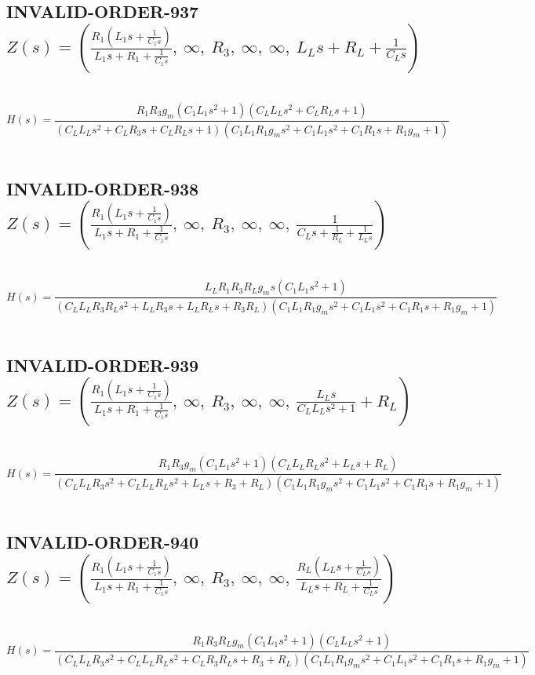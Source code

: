 \documentclass{article}
\begin{document}
\subsection{INVALID-ORDER-937 $Z(s) = \left( \frac{R_{1} \left(L_{1} s + \frac{1}{C_{1} s}\right)}{L_{1} s + R_{1} + \frac{1}{C_{1} s}}, \  \infty, \  R_{3}, \  \infty, \  \infty, \  L_{L} s + R_{L} + \frac{1}{C_{L} s}\right)$ } \ 
\textbf{\[H(s) = \frac{R_{1} R_{3} g_{m} \left(C_{1} L_{1} s^{2} + 1\right) \left(C_{L} L_{L} s^{2} + C_{L} R_{L} s + 1\right)}{\left(C_{L} L_{L} s^{2} + C_{L} R_{3} s + C_{L} R_{L} s + 1\right) \left(C_{1} L_{1} R_{1} g_{m} s^{2} + C_{1} L_{1} s^{2} + C_{1} R_{1} s + R_{1} g_{m} + 1\right)}\] } \ 
\subsection{INVALID-ORDER-938 $Z(s) = \left( \frac{R_{1} \left(L_{1} s + \frac{1}{C_{1} s}\right)}{L_{1} s + R_{1} + \frac{1}{C_{1} s}}, \  \infty, \  R_{3}, \  \infty, \  \infty, \  \frac{1}{C_{L} s + \frac{1}{R_{L}} + \frac{1}{L_{L} s}}\right)$ } \ 
\textbf{\[H(s) = \frac{L_{L} R_{1} R_{3} R_{L} g_{m} s \left(C_{1} L_{1} s^{2} + 1\right)}{\left(C_{L} L_{L} R_{3} R_{L} s^{2} + L_{L} R_{3} s + L_{L} R_{L} s + R_{3} R_{L}\right) \left(C_{1} L_{1} R_{1} g_{m} s^{2} + C_{1} L_{1} s^{2} + C_{1} R_{1} s + R_{1} g_{m} + 1\right)}\] } \ 
\subsection{INVALID-ORDER-939 $Z(s) = \left( \frac{R_{1} \left(L_{1} s + \frac{1}{C_{1} s}\right)}{L_{1} s + R_{1} + \frac{1}{C_{1} s}}, \  \infty, \  R_{3}, \  \infty, \  \infty, \  \frac{L_{L} s}{C_{L} L_{L} s^{2} + 1} + R_{L}\right)$ } \ 
\textbf{\[H(s) = \frac{R_{1} R_{3} g_{m} \left(C_{1} L_{1} s^{2} + 1\right) \left(C_{L} L_{L} R_{L} s^{2} + L_{L} s + R_{L}\right)}{\left(C_{L} L_{L} R_{3} s^{2} + C_{L} L_{L} R_{L} s^{2} + L_{L} s + R_{3} + R_{L}\right) \left(C_{1} L_{1} R_{1} g_{m} s^{2} + C_{1} L_{1} s^{2} + C_{1} R_{1} s + R_{1} g_{m} + 1\right)}\] } \ 
\subsection{INVALID-ORDER-940 $Z(s) = \left( \frac{R_{1} \left(L_{1} s + \frac{1}{C_{1} s}\right)}{L_{1} s + R_{1} + \frac{1}{C_{1} s}}, \  \infty, \  R_{3}, \  \infty, \  \infty, \  \frac{R_{L} \left(L_{L} s + \frac{1}{C_{L} s}\right)}{L_{L} s + R_{L} + \frac{1}{C_{L} s}}\right)$ } \ 
\textbf{\[H(s) = \frac{R_{1} R_{3} R_{L} g_{m} \left(C_{1} L_{1} s^{2} + 1\right) \left(C_{L} L_{L} s^{2} + 1\right)}{\left(C_{L} L_{L} R_{3} s^{2} + C_{L} L_{L} R_{L} s^{2} + C_{L} R_{3} R_{L} s + R_{3} + R_{L}\right) \left(C_{1} L_{1} R_{1} g_{m} s^{2} + C_{1} L_{1} s^{2} + C_{1} R_{1} s + R_{1} g_{m} + 1\right)}\] } \ 
\end{document}
